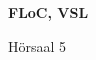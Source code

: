 \documentclass[a4paper]{article}
\begin{document}
\printGenericVSLHeader
\begin{center}
\begin{vsltext}{3cm}{4cm}

   \vspace{0.5cm} 

    \textbf{FLoC, VSL} 

    \vspace{1.5cm}

    Hörsaal 5

\end{vsltext}

\end{center}
\end{document}
